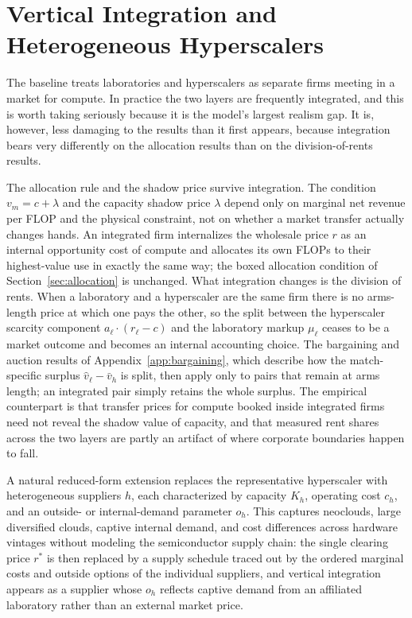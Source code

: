 \documentclass[11pt]{article}
\begin{document}
\section{Vertical Integration and Heterogeneous Hyperscalers}
\label{sec:vertical-integration}

The baseline treats laboratories and hyperscalers as separate firms meeting in a market for compute. In practice the two layers are frequently integrated, and this is worth taking seriously because it is the model's largest realism gap. It is, however, less damaging to the results than it first appears, because integration bears very differently on the allocation results than on the division-of-rents results.

The allocation rule and the shadow price survive integration. The condition $v_m=c+\lambda$ and the capacity shadow price $\lambda$ depend only on marginal net revenue per FLOP and the physical constraint, not on whether a market transfer actually changes hands. An integrated firm internalizes the wholesale price $r$ as an internal opportunity cost of compute and allocates its own FLOPs to their highest-value use in exactly the same way; the boxed allocation condition of Section~\ref{sec:allocation} is unchanged. What integration changes is the division of rents. When a laboratory and a hyperscaler are the same firm there is no arms-length price at which one pays the other, so the split between the hyperscaler scarcity component $a_\ell\cdot(r_\ell-c)$ and the laboratory markup $\mu_\ell$ ceases to be a market outcome and becomes an internal accounting choice. The bargaining and auction results of Appendix~\ref{app:bargaining}, which describe how the match-specific surplus $\widehat v_\ell-\bar v_h$ is split, then apply only to pairs that remain at arms length; an integrated pair simply retains the whole surplus. The empirical counterpart is that transfer prices for compute booked inside integrated firms need not reveal the shadow value of capacity, and that measured rent shares across the two layers are partly an artifact of where corporate boundaries happen to fall.

A natural reduced-form extension replaces the representative hyperscaler with heterogeneous suppliers $h$, each characterized by capacity $K_h$, operating cost $c_h$, and an outside- or internal-demand parameter $o_h$. This captures neoclouds, large diversified clouds, captive internal demand, and cost differences across hardware vintages without modeling the semiconductor supply chain: the single clearing price $r^*$ is then replaced by a supply schedule traced out by the ordered marginal costs and outside options of the individual suppliers, and vertical integration appears as a supplier whose $o_h$ reflects captive demand from an affiliated laboratory rather than an external market price.
\end{document}
